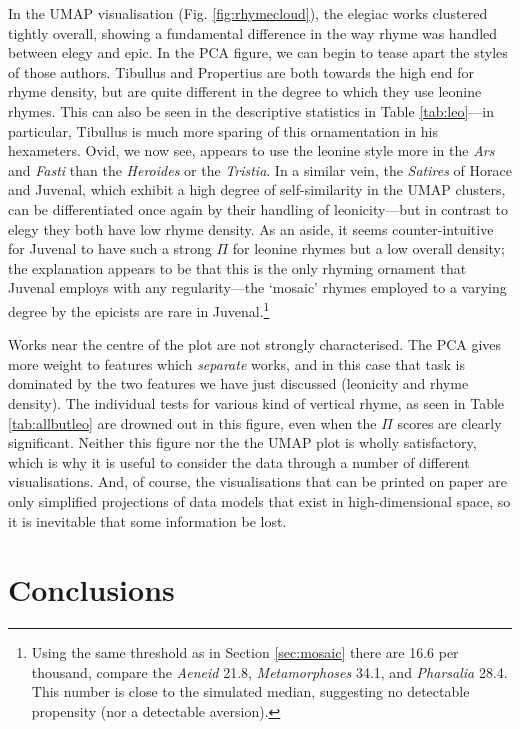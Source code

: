 \documentclass[twocolumn, switch]{article} %
\begin{document}
In the UMAP visualisation (Fig. \ref{fig:rhymecloud}), the elegiac works
clustered tightly overall, showing a fundamental difference in the way rhyme
was handled between elegy and epic. In the PCA figure, we can begin to tease
apart the styles of those authors. Tibullus and Propertius are both towards
the high end for rhyme density, but are quite different in the degree to which
they use leonine rhymes. This can also be seen in the descriptive statistics
in Table \ref{tab:leo}---in particular, Tibullus is much more sparing of this
ornamentation in his hexameters. Ovid, we now see, appears to use the leonine
style more in the \emph{Ars} and \emph{Fasti} than the \emph{Heroides} or the
\emph{Tristia}. In a similar vein, the \emph{Satires} of Horace and Juvenal,
which exhibit a high degree of self-similarity in the UMAP clusters, can be
differentiated once again by their handling of leonicity---but in contrast to
elegy they both have low rhyme density. As an aside, it seems
counter-intuitive for Juvenal to have such a strong $\Pi$ for leonine rhymes
but a low overall density; the explanation appears to be that this is the only
rhyming ornament that Juvenal employs with any regularity---the `mosaic' rhymes
employed to a varying degree by the epicists are rare in Juvenal.\footnote{
  Using the same threshold as in Section \ref{sec:mosaic} there are 16.6 per
  thousand, compare the \emph{Aeneid} 21.8, \emph{Metamorphoses} 34.1, and
  \emph{Pharsalia} 28.4. This number is close to the simulated median,
  suggesting no detectable propensity (nor a detectable aversion).
}

Works near the centre of the plot are not strongly characterised. The PCA
gives more weight to features which \emph{separate} works, and in this case
that task is dominated by the two features we have just discussed (leonicity
and rhyme density). The individual tests for various kind of vertical rhyme,
as seen in Table \ref{tab:allbutleo} are drowned out in this figure, even when
the $\Pi$ scores are clearly significant. Neither this figure nor the the UMAP
plot is wholly satisfactory, which is why it is useful to consider the data
through a number of different visualisations. And, of course, the
visualisations that can be printed on paper are only simplified projections of
data models that exist in high-dimensional space, so it is inevitable that
some information be lost.

\section{Conclusions}
\label{sec:conclusion}
\end{document}
